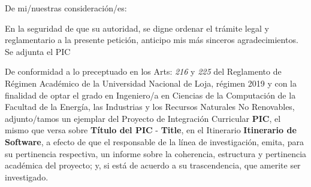 \documentclass[12pt,a4paper,sans]{moderncv}
\newcommand{\titulo}{Título del PIC}
\newcommand{\tituloEng}{Title}
\newcommand{\lineaInv}{Itinerario de Software}
\begin{document}
\date{Loja, 2 de septiembre del 2022}
\opening{De mi/nuestras consideración/es:}
\closing{En la seguridad de que su autoridad, se digne ordenar el trámite legal y reglamentario a la presente petición, anticipo mis más sinceros agradecimientos. Se adjunta el PIC}
\makelettertitle

De conformidad a lo preceptuado en los Arts: \textit{216} y \textit{225} del Reglamento de Régimen Académico de la Universidad Nacional de Loja, régimen 2019 y con la finalidad de optar el grado en Ingeniero/a en Ciencias de la Computación de la Facultad de la Energía, las Industrias y los Recursos Naturales No Renovables, adjunto/tamos un ejemplar del Proyecto de Integración Curricular \textbf{PIC}, el mismo que versa sobre \textbf{\titulo} - \textbf{\tituloEng}, en el Itinerario \textbf{\lineaInv}, a efecto de que el responsable de la línea de investigación, emita, para su pertinencia respectiva, un informe sobre la coherencia, estructura y pertinencia académica del proyecto; y, si está de acuerdo a su trascendencia, que amerite ser investigado.

\makeletterclosing
\end{document}
